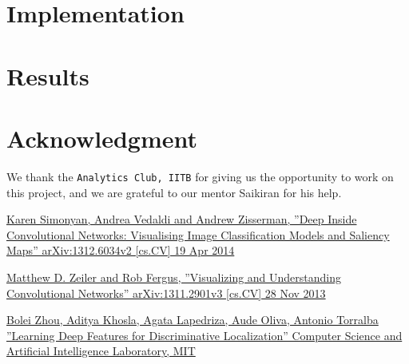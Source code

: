\documentclass[conference]{IEEEtran}
\begin{document}
\section{Implementation}



\section{Results}
\section*{Acknowledgment}

We thank the \texttt{Analytics Club, IITB} for giving us the opportunity to work on this project, and we are grateful to our mentor Saikiran for his help.


\begin{thebibliography}{00}
 \href{https://arxiv.org/pdf/1312.6034.pdf}{Karen Simonyan, Andrea Vedaldi and Andrew Zisserman, ''Deep Inside Convolutional Networks: Visualising
Image Classification Models and Saliency Maps'' arXiv:1312.6034v2 [cs.CV] 19 Apr 2014}

 \href{https://arxiv.org/pdf/1311.2901.pdf}{Matthew D. Zeiler and Rob Fergus, ''Visualizing and Understanding Convolutional Networks'' arXiv:1311.2901v3 [cs.CV] 28 Nov 2013}

 \href{http://cnnlocalization.csail.mit.edu/Zhou_Learning_Deep_Features_CVPR_2016_paper.pdf}{Bolei Zhou, Aditya Khosla, Agata Lapedriza, Aude Oliva, Antonio Torralba ''Learning Deep Features for Discriminative Localization'' Computer Science and Artificial Intelligence Laboratory, MIT}
\end{thebibliography}
\end{document}
